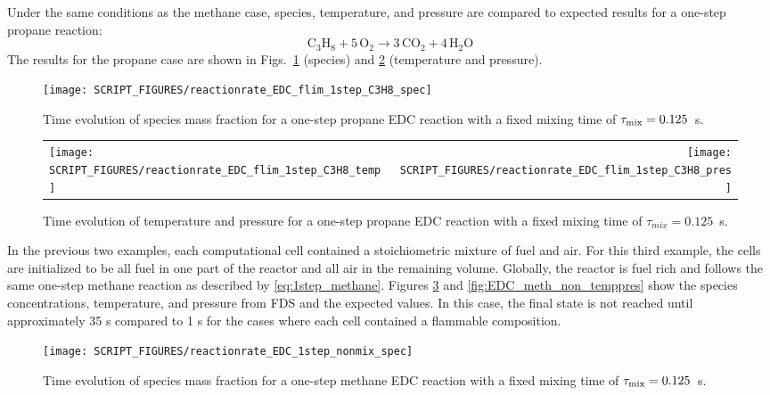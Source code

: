 \documentclass[11pt]{book}
\begin{document}
Under the same conditions as the methane case, species, temperature, and pressure are compared to expected results for a one-step propane reaction:
\begin{equation}\label{eq:1step_propane}
\mathrm{C_3H_8 + 5\, O_2 \rightarrow  3\, CO_2 + 4\, H_2O}
\end{equation}
The results for the propane case are shown in Figs.~\ref{fig:EDC_1Step_prop_spec} (species) and \ref{fig:EDC_1Step_prop_temppres} (temperature and pressure).

\begin{figure}[!ht]
\centering
\texttt{[image: SCRIPT\_FIGURES/reactionrate\_EDC\_flim\_1step\_C3H8\_spec]}
\caption[Species evolution in a 1-step propane EDC reaction]{Time evolution of species mass fraction for a one-step propane EDC reaction with a fixed mixing time of $\tau_{\rm mix}=0.125$~s.}
\label{fig:EDC_1Step_prop_spec}
\end{figure}

\begin{figure}[!ht]
\begin{tabular*}{\textwidth}{lr}
\texttt{[image: SCRIPT\_FIGURES/reactionrate\_EDC\_flim\_1step\_C3H8\_temp]} &
\texttt{[image: SCRIPT\_FIGURES/reactionrate\_EDC\_flim\_1step\_C3H8\_pres]}
\end{tabular*}
\caption[Temperature and pressure evolution in a 1-step propane EDC reaction]{Time evolution of temperature and pressure for a one-step propane EDC reaction with a fixed mixing time of $\tau_{mix}=0.125$~s.}
\label{fig:EDC_1Step_prop_temppres}
\end{figure}

In the previous two examples, each computational cell contained a stoichiometric mixture of fuel and air. For this third example, the cells are initialized to be all fuel in one part of the reactor and all air in the remaining volume. Globally, the reactor is fuel rich and follows the same one-step methane reaction as described by \ref{eq:1step_methane}. Figures \ref{fig:EDC_meth_non_spec} and \ref{fig:EDC_meth_non_temppres} show the species concentrations, temperature, and pressure from FDS and the expected values. In this case, the final state is not reached until approximately 35 s compared to 1 s for the cases where each cell contained a flammable composition.

\begin{figure}[!ht]
\centering
\texttt{[image: SCRIPT\_FIGURES/reactionrate\_EDC\_1step\_nonmix\_spec]}
\caption[Species evolution in 1-Step methane EDC reaction]{Time evolution of species mass fraction for a one-step methane EDC reaction with a fixed mixing time of $\tau_{\rm mix}=0.125$~s. }
\label{fig:EDC_meth_non_spec}
\end{figure}
\end{document}
